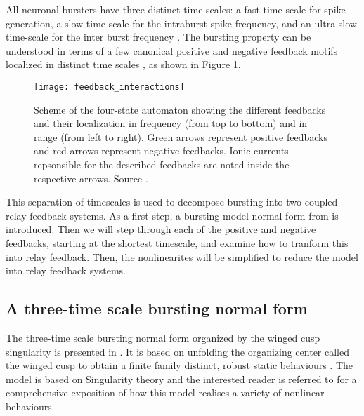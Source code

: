 \documentclass[a4paper, 12pt]{article}
\begin{document}
All neuronal bursters have three distinct time scales: a fast time-scale for spike generation, a slow time-scale for the intraburst spike frequency, and an ultra slow time-scale for the inter burst frequency \cite{franci2}. The bursting property can be understood in terms of a few canonical positive and negative feedback motifs localized in distinct time scales \cite{drion}, as shown in Figure \ref{fig:p_n_feedbacks}.

\begin{figure}[h!]
\texttt{[image: feedback\_interactions]}
\caption{Scheme of the four-state automaton showing the different feedbacks and their localization in frequency (from top to bottom) and in range (from left to right). Green arrows represent positive feedbacks and red arrows represent negative feedbacks. Ionic currents repsonsible for the described feedbacks are noted inside the respective arrows. Source \cite{drion}.}
\label{fig:p_n_feedbacks}
\end{figure}

This separation of timescales is used to decompose bursting into two coupled relay feedback systems. As a first step, a bursting model normal form from \cite{franci} is introduced. Then we will step through each of the positive and negative feedbacks, starting at the shortest timescale, and examine how to tranform this into relay feedback. Then, the nonlinearites will be simplified to reduce the model into relay feedback systems. 

\subsection{A three-time scale bursting normal form}
The three-time scale bursting normal form organized by the winged cusp singularity is presented in \cite{franci}. It is based on unfolding the organizing center called the winged cusp to obtain a finite family distinct, robust static behaviours \cite{franci}. The model is based on Singularity theory and the interested reader is referred to \cite{franci} for a comprehensive exposition of how this model realises a variety of nonlinear behaviours. 
\end{document}
